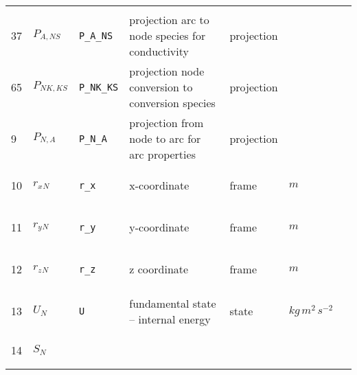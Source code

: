 \begin{longtable}{|p{1cm}|p{2.5cm}|p{4.5cm}|p{8cm}|p{3.0cm}|p{3cm}|p{1cm}|}
             & $  $
             & \\
            37
             & \hypertarget{"v:37"}{ $ {P}{_{A, {N S}}} $}
             & \verb|P_A_NS|
             & projection arc to node species for conductivity
             & \begin{lay}projection \end{lay}
             & $  $
             & \\
            65
             & \hypertarget{"v:65"}{ $ {P}{_{{N K}, {K S}}} $}
             & \verb|P_NK_KS|
             & projection node conversion to conversion species
             & \begin{lay}projection \end{lay}
             & $  $
             & \\
            9
             & \hypertarget{"v:9"}{ $ {P}{_{N, A}} $}
             & \verb|P_N_A|
             & projection from node to arc for arc properties
             & \begin{lay}projection \end{lay}
             & $  $
             & \\
            10
             & \hypertarget{"v:10"}{ $ {{r_x}}{_{N}} $}
             & \verb|r_x|
             & x-coordinate
             & \begin{lay}frame \end{lay}
             & $ m  $
             & \\
            11
             & \hypertarget{"v:11"}{ $ {{r_y}}{_{N}} $}
             & \verb|r_y|
             & y-coordinate
             & \begin{lay}frame \end{lay}
             & $ m  $
             & \\
            12
             & \hypertarget{"v:12"}{ $ {{r_z}}{_{N}} $}
             & \verb|r_z|
             & z coordinate
             & \begin{lay}frame \end{lay}
             & $ m  $
             & \\
            13
             & \hypertarget{"v:13"}{ $ {U}{_{N}} $}
             & \verb|U|
             & fundamental state -- internal energy
             & \begin{lay}state \end{lay}
             & $ kg \,m^{2} \,s^{-2} \, $
             & \\
            14
             & \hypertarget{"v:14"}{ $ {S}{_{N}} $}

\end{longtable}
